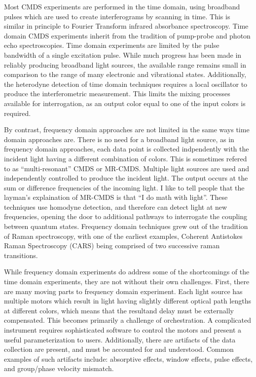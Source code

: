 Most CMDS experiments are performed in the time domain, using broadband pulses which are used to create interferograms by scanning in time\cite{MukamelShaul2009a,GallagherSarahM1998a}.
This is similar in principle to Fourier Transform infrared absorbance spectroscopy.
Time domain CMDS experiments inherit from the tradition of pump-probe and photon echo spectroscopies\cite{Hybl_1998}.
Time domain experiments are limited by the pulse bandwidth of a single excitation pulse.
While much progress has been made in reliably producing broadband light sources\cite{KearnsNicholasM2017a}, the available range remains small in comparison to the range of many electronic and vibrational states.
Additionally, the heterodyne detection of time domain techniques requires a local oscillator to produce the interferometric measurement.
This limits the mixing processes available for interrogation, as an output color equal to one of the input colors is required.

By contrast, frequency domain approaches are not limited in the same ways time domain approaches are.
There is no need for a broadband light source, as in frequency domain approaches, each data point is collected indpendently with the incident light having a different combination of colors.
This is sometimes refered to as ``multi-resonant'' CMDS or MR-CMDS\cite{ThompsonBlaiseJonathan2018a}.
Multiple light sources are used and independently controlled to produce the incident light.
The output occurs at the sum or difference frequencies of the incoming light.
I like to tell people that the layman's explaination of MR-CMDS is that ``I do math with light''.
These techniques use homodyne detection, and therefore can detect light at new frequencies, opening the door to additional pathways to interrogate the coupling between quantum states.
Frequency domain techniques grew out of the tradition of Raman spectroscopy, with one of the earliest examples, Coherent Antistokes Raman Spectroscopy (CARS) being comprised of two successive raman transitions\cite{Tolles1977}.

While frequency domain experiments do address some of the shortcomings of the time domain experiments, they are not without their own challenges.
First, there are many moving parts to frequency domain experiment.
Each light source has multiple motors which result in light having slightly different optical path lengths at different colors, which means that the resultand delay must be externally compensated.
This becomes primarily a challenge of orchestration.
A complicated instrument requires sophisticated software to control the motors and present a useful parameterization to users.
Additionally, there are artifacts of the data collection are present, and must be accounted for and understood.
Common examples of such artifacts include: absorptive effects\cite{CarlsonRogerJ1989a}, window effects\cite{MurdochKiethM2000a,HandaliJonathanDaniel2018b}, pulse effects\cite{SpencerAustinP2015a}, and group/phase velocity mismatch\cite{MorrowDarienJames2017a}.

